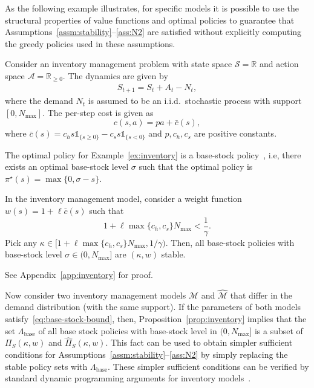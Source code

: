 \documentclass[letterpaper, 10pt]{IEEEtran}
\newcommand*\ALPHABET{\mathcal}
\newcommand*\IND{\mathds{1}}
\newcommand*\reals{\mathds{R}}
\newcommand*\tuple{\kappa, w}
\begin{document}
As the following example illustrates, for specific models it is possible to use the structural properties of value functions and optimal policies to guarantee that Assumptions~\ref{assm:stability}--\ref{ass:N2} are satisfied without explicitly computing the greedy policies used in these assumptions.

\begin{example}\label{ex:inventory}
Consider an inventory management problem with state space  $\ALPHABET S = \reals$ and action space $\ALPHABET A = \reals_{\geq 0}$. The dynamics are given by
\begin{align*}
    S_{t+1} = S_t + A_t - N_t,
\end{align*}
where the demand $N_t$ is assumed to be an i.i.d.\ stochastic process with support $[0,N_{\max}]$.
The per-step cost is given as 
\[
    c(s,a) = pa +  \bar c(s),
\]
where $\bar c(s) = c_h s \IND_{\{s \ge 0\}} - c_s s\IND_{\{s < 0\}}$ and $p, c_h, c_s$ are positive constants.
\end{example}

The optimal policy for Example~\ref{ex:inventory} is a base-stock policy~\cite{arrow1951optimal,bertsekas2015dynamic}, i.e, there exists an optimal base-stock level $\sigma$ such that the optimal policy is
$\pi^\star (s) = \max\{0,\sigma-s\}$.

\begin{proposition}\label{prop:inventory}
    In the inventory management model, consider a weight function $w(s) = 1 + \ell \bar c(s)$ such that
    \begin{equation}
        1 + \ell \max\{c_h,c_s\} N_{\max} < \frac 1\gamma.
        \label{eq:base-stock-bound}
    \end{equation}
    Pick any $\kappa \in [1 + \ell \max\{c_h,c_s\} N_{\max}, 1/\gamma)$.  Then, all base-stock policies with base-stock level $\sigma \in (0, N_{\max}]$ are $(\kappa, w)$ stable.
\end{proposition}
See Appendix~\ref{app:inventory} for proof.

Now consider two inventory management models $\ALPHABET M$ and $\hat {\ALPHABET M}$ that differ in the demand distribution (with the same support).
If the parameters of both models satisfy~\eqref{eq:base-stock-bound},  then, Proposition~\ref{prop:inventory} implies that the set $\Lambda_{\mathrm{base}}$ of all base stock policies with base-stock level in $(0, N_{\max}]$ is a subset of $\Pi_S(\tuple)$ and $\hat \Pi_S(\tuple)$. This fact can be used to obtain simpler sufficient conditions for Assumptions~\ref{assm:stability}--\ref{ass:N2} by simply replacing the stable policy sets with $\Lambda_{\mathrm{base}}$. These simpler sufficient conditions can be verified by standard dynamic programming arguments for inventory models~\cite{bertsekas2015dynamic}.
\end{document}
